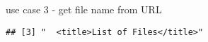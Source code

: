 \documentclass[ignorenonframetext,]{beamer}
\begin{document}
\begin{frame}[fragile]{use case 3 - get file name from URL}
\begin{verbatim}
## [3] "  <title>List of Files</title>"                                                                                                                                                                                                                                                                                                                                                                                                                                                                                                                                                                                                                                                                                                                                                                                                                                                                                                                                                                                                                                                                                                                                                                                                                                                                                                                                                                                                                                                                                                                                                                                                                                                                                                                                                                                                                                                                                                                                                                                                                                

\end{verbatim}
\end{frame}
\end{document}

